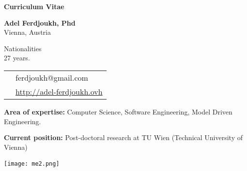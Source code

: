 \thispagestyle{empty}

\renewcommand\refname{~}

\begin{center}
\par\textbf{\huge Curriculum Vitae}
\end{center}

\vspace{.5cm}

\begin{minipage}{0.45\textwidth}
\textbf{Adel Ferdjoukh, Phd} \\
Vienna, Austria

\vspace{.3cm}

Nationalities \fr{} \dz{} \kab{} \\
27 years.

\vspace{.3cm}

\begin{tabular}{cl}
\email{} & ferdjoukh@gmail.com\\

\web{} & \url{http://adel-ferdjoukh.ovh}\\
\end{tabular}

\vspace{.3cm}
{\bf Area of expertise:} Computer Science, Software Engineering, Model Driven Engineering. 

\medskip
{\bf Current position:} Post-doctoral research at TU Wien (Technical University of Vienna)
\end{minipage}
\hfill
\begin{minipage}{0.45\textwidth}
\begin{flushright}
\texttt{[image: me2.png]}~~~~~~~~
\end{flushright}
\end{minipage}

\tair

\sectionline{}